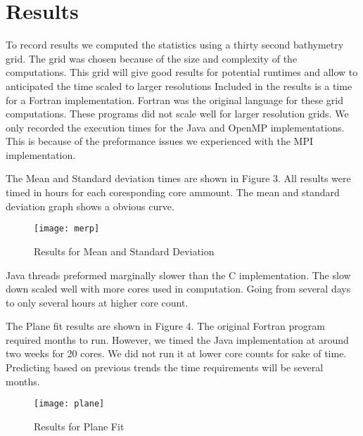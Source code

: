 \section{Results}
To record results we computed the statistics using a thirty second bathymetry grid.
The grid was chosen because of the size and complexity of the computations.
This grid will give good results for potential runtimes and allow to anticipated the time scaled to larger resolutions
Included in the results is a time for a Fortran implementation.
Fortran was the original language for these grid computations.
These programs did not scale well for larger resolution grids.
We only recorded the execution times for the Java and OpenMP implementations.
This is because of the preformance issues we experienced with the MPI implementation.

\par
The Mean and Standard deviation times are shown in Figure 3.
All results were timed in hours for each coresponding core ammount.
The mean and standard deviation graph shows a obvious curve.
\begin{figure}[h]
    \centering
    \texttt{[image: merp]}
    \caption{Results for Mean and Standard Deviation}
    \label{fig:3}
\end{figure}

\par
Java threads preformed marginally slower than the C implementation.
The slow down scaled well with more cores used in computation.
Going from several days to only several hours at higher core count.

\par
The Plane fit results are shown in Figure 4.
The original Fortran program required months to run.
However, we timed the Java implementation at around two weeks for 20 cores.
We did not run it at lower core counts for sake of time.
Predicting based on previous trends the time requirements will be several months.

\begin{figure}[h]
    \centering
    \texttt{[image: plane]}
    \caption{Results for Plane Fit}
    \label{fig:4}
\end{figure}

